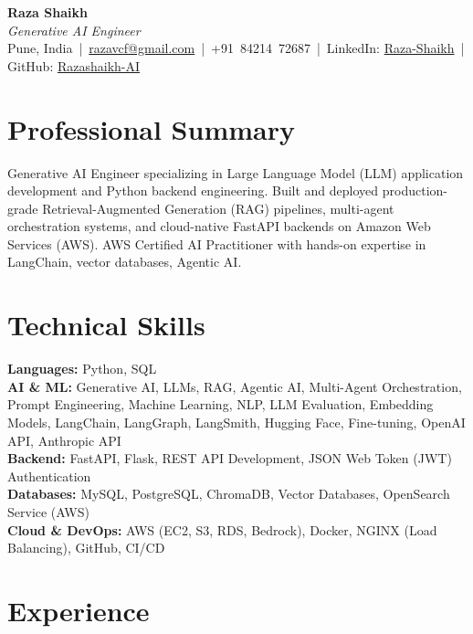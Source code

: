 \documentclass[10pt,a4paper]{article}
\begin{document}
\vspace{-20pt}
\begin{center}
    {\LARGE \textbf{Raza Shaikh}} \\
    \vspace{1pt}
    {\small \textit{Generative AI Engineer}} \\
    \vspace{2pt}
    {\small Pune, India \,|\, \href{mailto:razavcf@gmail.com}{razavcf@gmail.com} \,|\, +91~84214~72687 \,|\, LinkedIn: \href{https://www.linkedin.com/in/raza-shaikh-ai/}{Raza-Shaikh} \,|\, GitHub: \href{https://github.com/raza-shaikh-ai}{Razashaikh-AI}}
\end{center}

\vspace{-6pt}
\section*{Professional Summary}
Generative AI Engineer specializing in Large Language Model (LLM) application development and Python backend engineering. Built and deployed production-grade Retrieval-Augmented Generation (RAG) pipelines, multi-agent orchestration systems, and cloud-native FastAPI backends on Amazon Web Services (AWS). AWS Certified AI Practitioner with hands-on expertise in LangChain, vector databases, Agentic AI.

\vspace{-2pt}
\section*{Technical Skills}
\vspace{1pt}

\textbf{Languages:} Python, SQL \\
\textbf{AI \& ML:} Generative AI, LLMs, RAG, Agentic AI, Multi-Agent Orchestration, Prompt Engineering,
Machine Learning, NLP, LLM Evaluation, Embedding Models, LangChain, LangGraph, LangSmith, Hugging Face, Fine-tuning, OpenAI API, Anthropic API \\
\textbf{Backend:} FastAPI, Flask, REST API Development, JSON Web Token (JWT) Authentication \\
\textbf{Databases:} MySQL, PostgreSQL, ChromaDB, Vector Databases, OpenSearch Service (AWS) \\
\textbf{Cloud \& DevOps:} AWS (EC2, S3, RDS, Bedrock), Docker, NGINX (Load Balancing), GitHub, CI/CD

\vspace{-2pt}
\section*{Experience}
\vspace{1pt}
\end{document}
